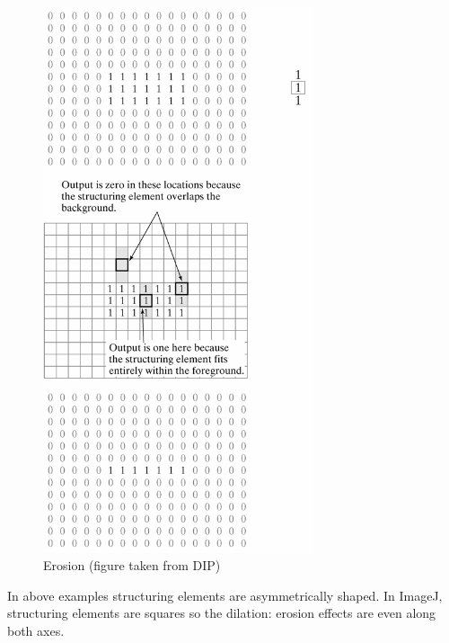 \begin{figure}[htbp]
\begin{center}
\includegraphics[width=8cm]{fig/CMCIBasicCourse201102-img66.png}
\caption{ Erosion (figure taken from DIP)}
\label{fig:img66}
\end{center}
\end{figure}

In above examples structuring elements are asymmetrically shaped. In
ImageJ, structuring elements are squares so the dilation: erosion
effects are even along both axes. 

